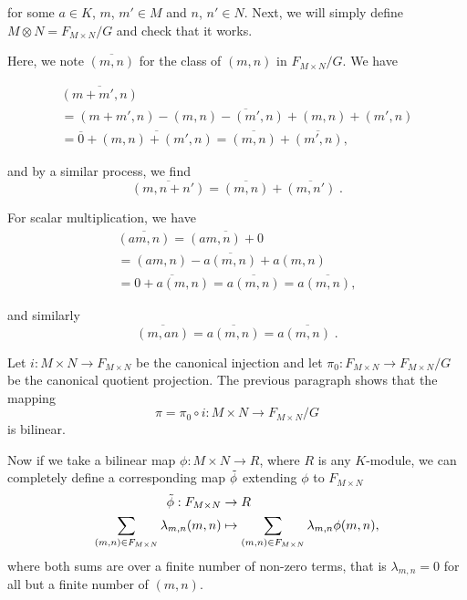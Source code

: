 \documentclass{report}
\theoremstyle{definition}
\theoremstyle{remark}
\begin{document}
    for some $a\in K$, $m$, $m'\in M$ and $n$, $n'\in N$.
    Next, we will simply define $M \otimes N = F_{M\times N}/G$ and check that it works. 
    
    Here, we note $\overline{(m,n)}$ for the class of $(m,n)$ in $F_{M\times N}/G$. We have
    
   \begin{gather*} 
  \overline{(m + m',n)}  \\ = \overline{(m+m',n) - (m,n) - (m',n) + (m,n) + (m',n)} \\
        = \overline{0} + \overline{(m,n)+(m',n)}=\overline{(m,n)}+\overline{(m',n)},
    \end{gather*}
  
    and by a similar process, we find 
    $$\overline{(m,n+n')} = \overline{(m,n)} + \overline{(m,n')}\;.$$
    
    For scalar multiplication, we have 
    \begin{gather*}
            \overline{(am,n)} = \overline{(am,n) + 0} \\
        = \overline{(am,n) - a(m,n) + a(m,n)} \\
        = \overline{0 + a(m,n)} = \overline{a(m,n)}=a\overline{(m,n)},
        \end{gather*}
    
    and similarly $$\overline{(m,an)} = \overline{a(m,n)}=a\overline{(m,n)}\;.$$
    
    Let $i : M \times N \to F_{M \times N}$ be the canonical injection and let $\pi_0 : F_{M \times N} \to F_{M \times N}/G$ be the canonical quotient projection. The previous paragraph shows that the mapping  $$\pi = \pi_0 \circ i :M \times N \longrightarrow F_{M\times N}/G $$ is bilinear. 
    
    Now if we take a bilinear map $\phi : M \times N \longrightarrow R$, where $R$ is any $K$-module, we can completely define a corresponding map $\Tilde{\phi}$ extending $\phi$ to $F_{M\times N}$
    \begin{equation*}
    \begin{split}
        \Tilde{\phi}: F_{M\times N} &\to R \\ \sum_{(m,n) \in F_{M\times N}}\lambda_{m,n}(m,n) &\mapsto \sum_{(m,n) \in F_{M\times N}}\lambda_{m,n}\phi(m,n), 
        \end{split}
    \end{equation*} where both sums are over a finite number of non-zero terms, that is $\lambda_{m,n} = 0$ for all but a finite number of $(m,n)$.
    
\end{document}
